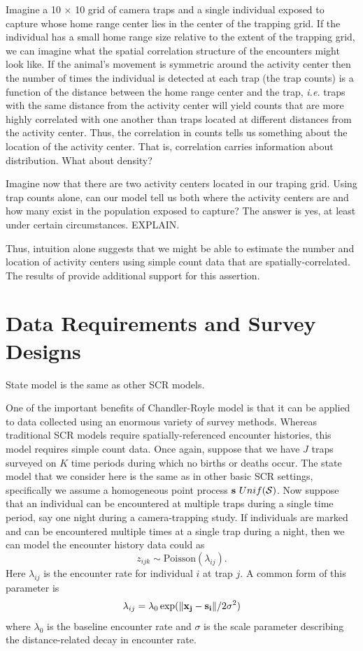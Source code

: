 Imagine a 10 $\times$ 10 grid of camera traps and a single individual
exposed to capture whose home range center lies in the center of the
trapping grid. If the individual has a small home range size relative
to the extent of the trapping grid, we can imagine what the
spatial correlation structure of the encounters might look
like. If the animal's movement is symmetric around the activity center
then the number of times the individual is detected at each
trap (the trap counts) is a function of the distance between the home
range center and the trap, \emph{i.e.} traps with the same distance from the
activity center will yield counts that are more highly correlated with
one another than traps located at different distances from the
activity center. Thus, the correlation in counts tells us something
about the location of the activity center. That is, correlation
carries information about distribution. What about density?

Imagine now that there are two activity centers located in our traping
grid. Using trap counts alone, can our model tell us both where the
activity centers are and how many exist in the population exposed to
capture? The answer is yes, at least under certain circumstances.
EXPLAIN.

Thus, intuition alone suggests that we might be able to estimate the
number and location of activity centers using simple count data that
are spatially-correlated. The results of
\citet{chandler_royle:2012} provide additional support for this
assertion.


\section{Data Requirements and Survey Designs}




State model is the same as other SCR models.


One of the important benefits of Chandler-Royle model is that it
can be applied to data collected using an enormous variety of survey
methods. Whereas traditional SCR models require spatially-referenced
encounter histories, this model requires simple count data. Once
again, suppose that we have $J$ traps surveyed on $K$ time periods
during which no births or deaths occur. The state model that we
consider here is the same as in other basic SCR settings, specifically
we assume a homogeneous point process ${\bf s} ~ Unif(\cal{S})$.
Now suppose that an
individual can be encountered at multiple traps during a single time
period, say one night during a camera-trapping study. If individuals
are marked and
can be encountered multiple times at a single trap during a
night, then we can model the encounter history data could as
\begin{equation}
 z_{ijk} \sim \mbox{Poisson}(\lambda_{ij}).
\label{eq.latentPoisson}
\end{equation}
Here $\lambda_{ij}$ is the encounter rate
for individual $i$ at trap $j$. A common form of this parameter is
\[
\lambda_{ij} = \lambda_0 \exp(\| {\bf x_j - s_i} \| / 2\sigma^2)
\]
where $\lambda_0$ is the baseline encounter rate and $\sigma$ is the
scale parameter describing the distance-related decay in encounter
rate.

